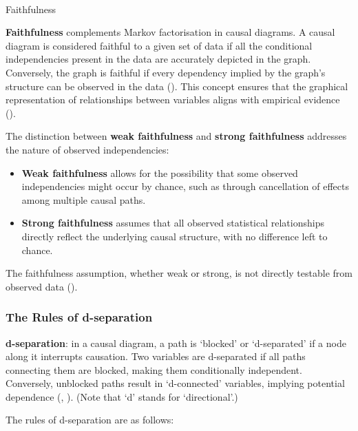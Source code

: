 \documentclass[
  single column]{article}
\makeatletter
\let\oldparagraph\paragraph
\renewcommand{\paragraph}{
    \@ifstar
      \xxxParagraphStar
      \xxxParagraphNoStar
  }
\newcommand{\xxxParagraphStar}[1]{\oldparagraph*{#1}\mbox{}}
\newcommand{\xxxParagraphNoStar}[1]{\oldparagraph{#1}\mbox{}}
\makeatother
\begin{document}
\paragraph{Faithfulness}\label{faithfulness}

\textbf{Faithfulness} complements Markov factorisation in causal
diagrams. A causal diagram is considered faithful to a given set of data
if all the conditional independencies present in the data are accurately
depicted in the graph. Conversely, the graph is faithful if every
dependency implied by the graph's structure can be observed in the data
(). This concept
ensures that the graphical representation of relationships between
variables aligns with empirical evidence
().

The distinction between \textbf{weak faithfulness} and \textbf{strong
faithfulness} addresses the nature of observed independencies:

\begin{itemize}
\item
  \textbf{Weak faithfulness} allows for the possibility that some
  observed independencies might occur by chance, such as through
  cancellation of effects among multiple causal paths.
\item
  \textbf{Strong faithfulness} assumes that all observed statistical
  relationships directly reflect the underlying causal structure, with
  no difference left to chance.
\end{itemize}

The faithfulness assumption, whether weak or strong, is not directly
testable from observed data ().

\subsubsection{The Rules of
d-separation}\label{the-rules-of-d-separation}

\textbf{d-separation}: in a causal diagram, a path is `blocked' or
`d-separated' if a node along it interrupts causation. Two variables are
d-separated if all paths connecting them are blocked, making them
conditionally independent. Conversely, unblocked paths result in
`d-connected' variables, implying potential dependence
(, ).
(Note that `d' stands for `directional'.)

The rules of d-separation are as follows:
\end{document}
